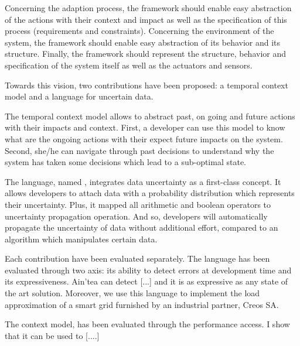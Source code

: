 Concerning the adaption process, the framework should enable easy abstraction of the actions with their context and impact as well as the specification of this process (requirements and constraints).
Concerning the environment of the system, the framework should enable easy abstraction of its behavior and its structure.
Finally, the framework should represent the structure, behavior and specification of the system itself as well as the actuators and sensors.

\bigskip
{}
Towards this vision, two contributions have been proposed: a temporal context model and a language for uncertain data.

The temporal context model allows to abstract past, on going and future actions with their impacts and context.
First, a developer can use this model to know what are the ongoing actions with their expect future impacts on the system.
Second, she/he can navigate through past decisions to understand why the system has taken some decisions which lead to a sub-optimal state.

The language, named \langName, integrates data uncertainty as a first-class concept.
It allows developers to attach data with a probability distribution which represents their uncertainty.
Plus, it mapped all arithmetic and boolean operators to uncertainty propagation operation. 
And so, developers will automatically propagate the uncertainty of data without additional effort, compared to an algorithm which manipulates certain data.

\bigskip
{}
Each contribution have been evaluated separately. 
The language has been evaluated through two axis: its ability to detect errors at development time and its expressiveness.
Ain'tea can detect [...] and it is as expressive as any state of the art solution.
Moreover, we use this language to implement the load approximation of a smart grid furnished by an industrial partner, Creos SA.

The context model, has been evaluated through the performance access.
I show that it can be used to [....]


\bigskip
\bigskip
\bigskip
{}


